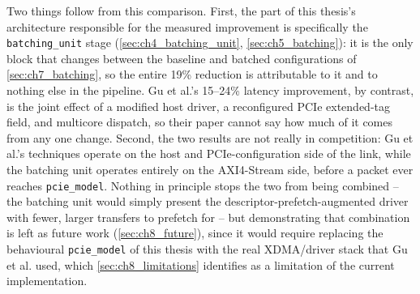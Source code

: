 Two things follow from this comparison. First, the part of this thesis's architecture responsible for the measured improvement is specifically the \texttt{batching\_unit} stage (\autoref{sec:ch4_batching_unit}, \autoref{sec:ch5_batching}): it is the only block that changes between the baseline and batched configurations of \autoref{sec:ch7_batching}, so the entire 19\% reduction is attributable to it and to nothing else in the pipeline. Gu et al.'s 15--24\% latency improvement, by contrast, is the joint effect of a modified host driver, a reconfigured PCIe extended-tag field, and multicore dispatch, so their paper cannot say how much of it comes from any one change. Second, the two results are not really in competition: Gu et al.'s techniques operate on the host and PCIe-configuration side of the link, while the batching unit operates entirely on the AXI4-Stream side, before a packet ever reaches \texttt{pcie\_model}. Nothing in principle stops the two from being combined -- the batching unit would simply present the descriptor-prefetch-augmented driver with fewer, larger transfers to prefetch for -- but demonstrating that combination is left as future work (\autoref{sec:ch8_future}), since it would require replacing the behavioural \texttt{pcie\_model} of this thesis with the real XDMA/driver stack that Gu et al. used, which \autoref{sec:ch8_limitations} identifies as a limitation of the current implementation.



